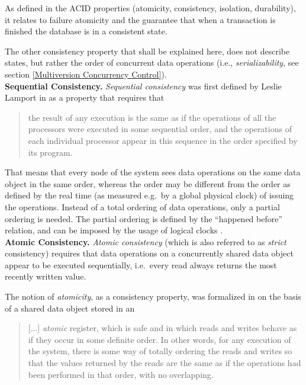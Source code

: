 As defined in the ACID properties (atomicity, consistency, isolation, durability), it relates to failure atomicity and the guarantee that when a transaction is finished the database is in a consistent state.

The other consistency property that shall be explained here, does not describe states, but rather the order of concurrent data operations (i.e., \emph{serializability}, see section \ref{Multiversion Concurrency Control}).\\

\noindent
{\bf Sequential Consistency.}
\emph{Sequential consistency} was first defined by Leslie Lamport in \cite{Lam79} as a property that requires that
\begin{quote}
the result of any execution is the same as if the operations of all the processors were executed in some sequential order, and the operations of each individual processor appear in this sequence in the order specified by its program.
\end{quote}

That means that every node of the system sees data operations on the same data object in the same order, whereas the order may be different from the order as defined by the real time (as measured e.g.\ by a global physical clock) of issuing the operations. Instead of a total ordering of data operations, only a partial ordering is needed. The partial ordering is defined by the ``happened before'' relation, and can be imposed by the usage of logical clocks \cite{Lam78}.\\

\noindent
{\bf Atomic Consistency.}
\emph{Atomic consistency} (which is also referred to as \emph{strict} consistency) requires that data operations on a concurrently shared data object appear to be executed sequentially, i.e.\ every read always returns the most recently written value.

The notion of \emph{atomicity}, as a consistency property, was formalized in \cite{Lam86} on the basis of a shared data object stored in an

\begin{quote}
[...] \emph{atomic} register, which is safe and in which reads and writes behave as if they occur in some definite order. In other words, for any execution of the system, there is some way of totally ordering the reads and writes so that the values returned by the reads are the same as if the operations had been performed in that order, with no overlapping.
\end{quote}

